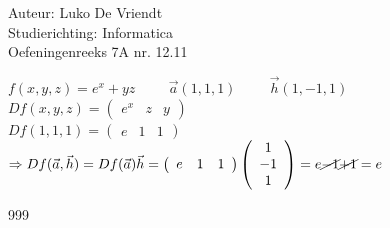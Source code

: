 \documentclass[a4paper]{article}
\begin{document}
\noindent \large Auteur: Luko De Vriendt\\
\noindent \large Studierichting: Informatica\\
\noindent \large Oefeningenreeks 7A nr. 12.11\\

\medskip

\normalsize

$f(x,y,z) = e^x + yz \hspace{1cm} \vec{a}(1,1,1) \hspace{1cm} \vec{h}(1,-1,1)$ \\

$Df(x,y,z) =
\left(
\begin{array}{ccc}
	e^x & z & y
\end{array}
\right)$ \\

$Df(1,1,1)=
\left(
\begin{array}{ccc}
	e & 1 & 1
\end{array}
\right)$ \\

$\Rightarrow Df(\vec{a},\vec{h}) = Df(\vec{a})\vec{h} =
\left(
\begin{array}{ccc}
	e & 1 & 1
\end{array}
\right)
\left(
\begin{array}{c}
	1 \\
    -1 \\
    1
\end{array}
\right) = e \cancel{- 1} \cancel{+ 1} = e$ \\

\begin{thebibliography}{999}
\end{thebibliography}
\end{document}
